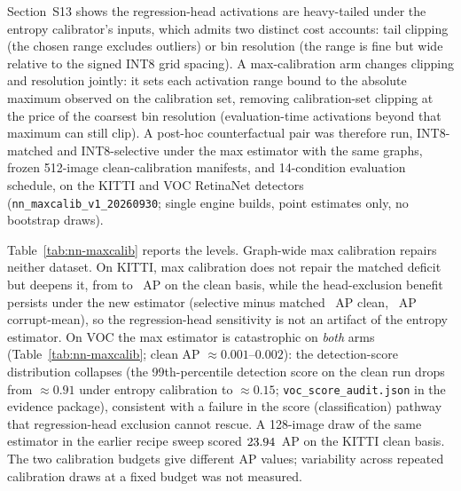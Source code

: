 \documentclass[10pt]{article}
\begin{document}
Section~S13 shows the regression-head activations are heavy-tailed under the
entropy calibrator's inputs, which admits two distinct cost accounts: tail
clipping (the chosen range excludes outliers) or bin resolution (the range is
fine but wide relative to the signed INT8 grid spacing). A max-calibration arm
changes clipping and resolution jointly: it sets each activation range bound to the absolute
maximum observed on the calibration set, removing calibration-set clipping
at the price of the coarsest bin resolution (evaluation-time activations
beyond that maximum can still clip). A post-hoc counterfactual pair was therefore run, INT8-matched and
INT8-selective under the max estimator with the same graphs, frozen 512-image
clean-calibration manifests, and 14-condition evaluation schedule, on the
KITTI and VOC RetinaNet detectors (\texttt{nn\_maxcalib\_v1\_20260930};
single engine builds, point estimates only, no bootstrap draws).

Table~\ref{tab:nn-maxcalib} reports the levels. Graph-wide max calibration
repairs neither dataset. On KITTI, max calibration does not repair
the matched deficit but deepens it, from \nnArmInCleanKitti{} to
\nnMcMaxJKitti{}~AP on the clean basis, while the head-exclusion benefit
persists under the new estimator (selective minus matched
\nnMcSelGainJKitti{}~AP clean, \nnMcSelGainCKitti{}~AP corrupt-mean), so the
regression-head sensitivity is not an artifact of the entropy estimator. On
VOC the max estimator is catastrophic on \emph{both} arms
(Table~\ref{tab:nn-maxcalib}; clean AP $\approx0.001$--$0.002$): the detection-score distribution
collapses (the 99th-percentile detection score on the clean run drops from
$\approx 0.91$ under entropy calibration to $\approx 0.15$;
\texttt{voc\_score\_audit.json} in the evidence package), consistent with a
failure in the score (classification) pathway that regression-head
exclusion cannot rescue. A 128-image draw of the same estimator
in the earlier recipe sweep scored $23.94$~AP on the KITTI clean
basis. The two calibration budgets give different AP values; variability across
repeated calibration draws at a fixed budget was not measured.
\end{document}

